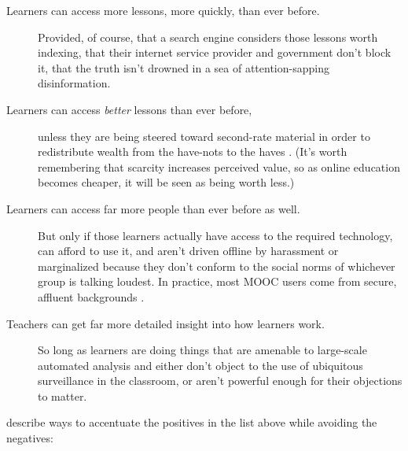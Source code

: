 \begin{description}
\item[Learners can access more lessons, more quickly, than ever before.]
Provided, of course, that a search engine considers those lessons
worth indexing, that their internet service provider and government
don't block it, that the truth isn't drowned in a sea of
attention-sapping disinformation.
\item[Learners can access \emph{better} lessons than ever before,]
unless they are being steered toward second-rate material in order
to redistribute wealth from the have-nots to the haves
\cite{McMi2017}. (It's worth remembering that scarcity increases
perceived value, so as online education becomes cheaper, it will be
seen as being worth less.)
\item[Learners can access far more people than ever before as well.]
But only if those learners actually have access to the required
technology, can afford to use it, and aren't driven offline by
harassment or marginalized because they don't conform to the social
norms of whichever group is talking loudest. In practice, most MOOC
users come from secure, affluent backgrounds \cite{Hansen2015}.
\item[Teachers can get far more detailed insight into how learners work.]
So long as learners are doing things that are amenable to
large-scale automated analysis and either don't object to the use of
ubiquitous surveillance in the classroom, or aren't powerful enough
for their objections to matter.
\end{description}

\cite{Marg2015,Mill2016a,Nils2017} describe ways to accentuate the
positives in the list above while avoiding the negatives:

